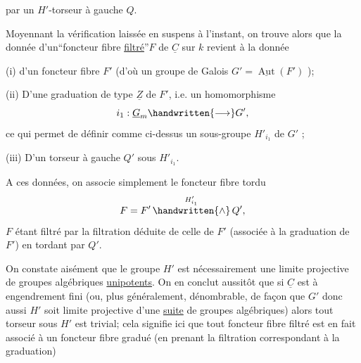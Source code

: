 %
par un $H'$-torseur à gauche $Q$.

Moyennant la vérification laissée en suspens à l'instant, on trouve alors que la donnée d'un``foncteur fibre \uline{filtré}''$F$ de $\underline{C}$ sur $k$ revient à la donnée

(i) d'un foncteur fibre $F'$  (d'où un groupe de Galois $G'=\underline{\operatorname{Aut}}(F')$ );

(ii) D'une graduation de type $\underline{Z}$ de $F'$, i.e. un homomorphisme
\[
i_1:\underline{G}_m\handwritten{\longrightarrow}G',
\]
ce qui permet de définir comme ci-dessus un sous-groupe $H'_{i_1}$ de $G'$ ;

(iii) D'un torseur à gauche $Q'$ sous $H'_{i_1}$.

A ces données, on associe simplement le foncteur fibre tordu
\[
F=F'\mathop{\handwritten{\wedge}}\limits^{H'_{i_1}}Q',
\]
$F$ étant filtré par la filtration déduite de celle de $F'$  (associée à la graduation de $F'$) en tordant par $Q'$.


On constate aisément que le groupe $H'$ est nécessairement une limite projective de groupes algébriques \uline{unipotents}. On en conclut aussitôt que si $\underline{C}$ est à engendrement fini (ou, plus généralement,  dénombrable, de façon que $G'$  donc aussi $H'$ soit limite projective d'une \uline{suite} de groupes algébriques) alors tout torseur sous $H'$ est trivial; cela signifie ici que tout foncteur fibre filtré est en fait associé à un foncteur fibre gradué (en prenant la filtration correspondant à la graduation)

